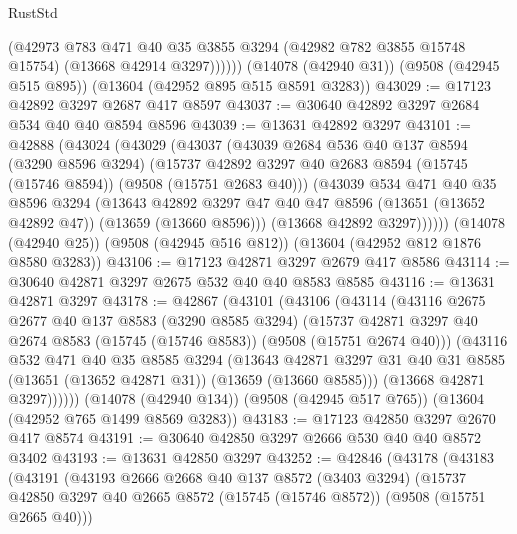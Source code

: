 \begin{lexlean}{RustStd}
\begin{coremodule}
            (@42973
              @783
              @471
              @40
              @35
              @3855
              @3294
              (@42982 @782 @3855 @15748 @15754)
              (@13668 @42914 @3297))))))
    (@14078 (@42940 @31))
    (@9508 (@42945 @515 @895))
    (@13604 (@42952 @895 @515 @8591 @3283))
@43029 := @17123 @42892 @3297 @2687 @417 @8597
@43037 := @30640 @42892 @3297 @2684 @534 @40 @40 @8594 @8596
@43039 := @13631 @42892 @3297
@43101 := @42888
    (@43024
      (@43029
        (@43037
          (@43039
            @2684
            @536
            @40
            @137
            @8594
            (@3290 @8596 @3294)
            (@15737 @42892 @3297 @40 @2683 @8594 (@15745 (@15746 @8594)) (@9508 (@15751 @2683 @40)))
            (@43039
              @534
              @471
              @40
              @35
              @8596
              @3294
              (@13643
                @42892
                @3297
                @47
                @40
                @47
                @8596
                (@13651 (@13652 @42892 @47))
                (@13659 (@13660 @8596)))
              (@13668 @42892 @3297))))))
    (@14078 (@42940 @25))
    (@9508 (@42945 @516 @812))
    (@13604 (@42952 @812 @1876 @8580 @3283))
@43106 := @17123 @42871 @3297 @2679 @417 @8586
@43114 := @30640 @42871 @3297 @2675 @532 @40 @40 @8583 @8585
@43116 := @13631 @42871 @3297
@43178 := @42867
    (@43101
      (@43106
        (@43114
          (@43116
            @2675
            @2677
            @40
            @137
            @8583
            (@3290 @8585 @3294)
            (@15737 @42871 @3297 @40 @2674 @8583 (@15745 (@15746 @8583)) (@9508 (@15751 @2674 @40)))
            (@43116
              @532
              @471
              @40
              @35
              @8585
              @3294
              (@13643
                @42871
                @3297
                @31
                @40
                @31
                @8585
                (@13651 (@13652 @42871 @31))
                (@13659 (@13660 @8585)))
              (@13668 @42871 @3297))))))
    (@14078 (@42940 @134))
    (@9508 (@42945 @517 @765))
    (@13604 (@42952 @765 @1499 @8569 @3283))
@43183 := @17123 @42850 @3297 @2670 @417 @8574
@43191 := @30640 @42850 @3297 @2666 @530 @40 @40 @8572 @3402
@43193 := @13631 @42850 @3297
@43252 := @42846
    (@43178
      (@43183
        (@43191
          (@43193
            @2666
            @2668
            @40
            @137
            @8572
            (@3403 @3294)
            (@15737 @42850 @3297 @40 @2665 @8572 (@15745 (@15746 @8572)) (@9508 (@15751 @2665 @40)))

\end{coremodule}
\end{lexlean}
